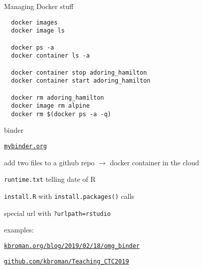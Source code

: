\documentclass[aspectratio=169,12pt,t]{beamer}
\begin{document}
\begin{frame}[fragile,c]{Managing Docker stuff}

\begin{lstlisting}
  docker images
  docker image ls

  docker ps -a
  docker container ls -a

  docker container stop adoring_hamilton
  docker container start adoring_hamilton

  docker rm adoring_hamilton
  docker image rm alpine
  docker rm $(docker ps -a -q)
\end{lstlisting}

\end{frame}






\begin{frame}{binder}

  \bbi
\item \href{https://mybinder.org}{\tt mybinder.org}
\item add two files to a github repo $\rightarrow$
  docker container in the cloud
  \bi
\item {\tt runtime.txt} telling date of R
\item {\tt install.R} with {\tt install.packages()} calls
\item special url with {\tt ?urlpath=rstudio}
  \ei
\item examples:
  \bi
\item \href{https://kbroman.org/blog/2019/02/18/omg_binder/}{\tt kbroman.org/blog/2019/02/18/omg\_binder}
\item \href{https://github.com/kbroman/Teaching_CTC2019}{\tt github.com/kbroman/Teaching\_CTC2019}
  \ei

  \ei

\end{frame}
\end{document}

